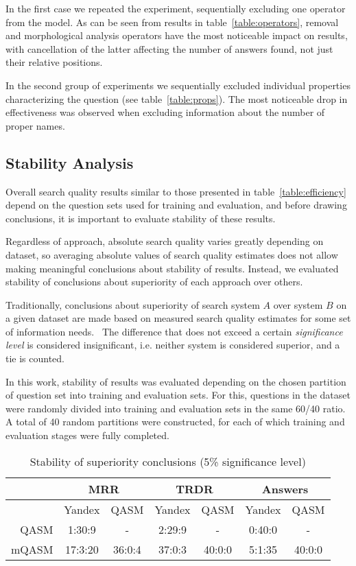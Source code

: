\documentclass{article}
\begin{document}
In the first case we repeated the experiment, sequentially excluding one
operator from the model. As can be seen from results in table~\ref{table:operators},
removal and morphological analysis operators have the most noticeable impact on results,
with cancellation of the latter affecting the number of answers found,
not just their relative positions.

In the second group of experiments we sequentially excluded
individual properties characterizing the question (see table~\ref{table:props}).
The most noticeable drop in effectiveness was observed when excluding
information about the number of proper names.

\subsection{Stability Analysis}

Overall search quality results similar to those presented in
table~\ref{table:efficiency} depend on the question sets used for
training and evaluation, and before drawing conclusions,
it is important to evaluate stability of these results.

Regardless of approach, absolute search quality varies greatly depending
on dataset, so averaging absolute values of search quality estimates
does not allow making meaningful conclusions about stability of
results. Instead, we evaluated stability of conclusions about
superiority of each approach over others.

Traditionally, conclusions about superiority of search system $A$ over system $B$ on
a given dataset are made based on measured search quality estimates
for some set of information needs.~\cite{irg:eval}
The difference that does not exceed a certain {\em significance level}
is considered insignificant, i.e. neither system is considered superior,
and a tie is counted.

In this work, stability of results was evaluated
depending on the chosen partition of question set
into training and evaluation sets.
For this, questions in the dataset were randomly divided into training
and evaluation sets in the same 60/40 ratio.
A total of 40 random partitions were constructed,
for each of which training and evaluation stages were fully completed.

\begin{table*}
\begin{center}
\begin{tabular}{|r|cc|cc|cc|}
\hline
    &  \multicolumn{2}{c|}{MRR} &  \multicolumn{2}{c|}{TRDR} &  \multicolumn{2}{c|}{Answers} \\
\hline
    & Yandex & QASM & Yandex & QASM & Yandex & QASM  \\
\hline
QASM         &  1:30:9   &   -           &   2:29:9  &  -              &  0:40:0   &  -  \\
mQASM  &  17:3:20  & 36:0:4   &    37:0:3   & 40:0:0   &  5:1:35  & 40:0:0  \\
\hline
\end{tabular}
\caption{Stability of superiority conclusions (5\% significance level)}
\label{table:stability}
\end{center}
\end{table*}
\end{document}
